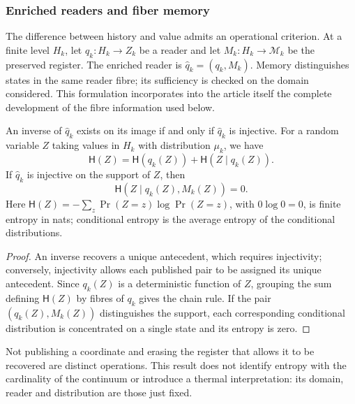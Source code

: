 \subsubsection{Enriched readers and fiber memory}
\label{ix:sec:ch-memoria-fibra}

The difference between history and value admits an operational criterion. At a
finite level \(H_k\), let \(q_k:H_k\to Z_k\) be a reader and let
\(M_k:H_k\to\mathcal M_k\) be the preserved register. The enriched reader
is \(\widehat q_k=(q_k,M_k)\). Memory distinguishes states in the same
reader fibre; its sufficiency is checked on the domain considered.
This formulation incorporates into the article itself the complete development of the
fibre information used below.

\begin{proposition}
\label{ix:prop:ch-recuperabilidad-fibra}
An inverse of \(\widehat q_k\) exists on its image if and only if
\(\widehat q_k\) is injective. For a random variable \(Z\) taking
values in \(H_k\) with distribution \(\mu_k\), we have
\[
 \mathsf H(Z)=\mathsf H(q_k(Z))+\mathsf H(Z\mid q_k(Z)).
\]
If \(\widehat q_k\) is injective on the support of \(Z\), then
\[
 \mathsf H(Z\mid q_k(Z),M_k(Z))=0.
\]
Here \(\mathsf H(Z)=-\sum_z\Pr(Z=z)\log\Pr(Z=z)\), with
\(0\log0=0\), is finite entropy in nats; conditional entropy is
the average entropy of the conditional distributions.
\end{proposition}

\begin{proof}
An inverse recovers a unique antecedent, which requires injectivity;
conversely, injectivity allows each published pair to be assigned its unique
antecedent. Since \(q_k(Z)\) is a deterministic function of \(Z\),
grouping the sum defining \(\mathsf H(Z)\) by fibres of \(q_k\) gives the
chain rule. If the pair \((q_k(Z),M_k(Z))\) distinguishes the support,
each corresponding conditional distribution is concentrated on a single
state and its entropy is zero.
\end{proof}

Not publishing a coordinate and erasing the register that allows it to be recovered are
distinct operations. This result does not identify entropy with the cardinality
of the continuum or introduce a thermal interpretation: its domain, reader and
distribution are those just fixed.

